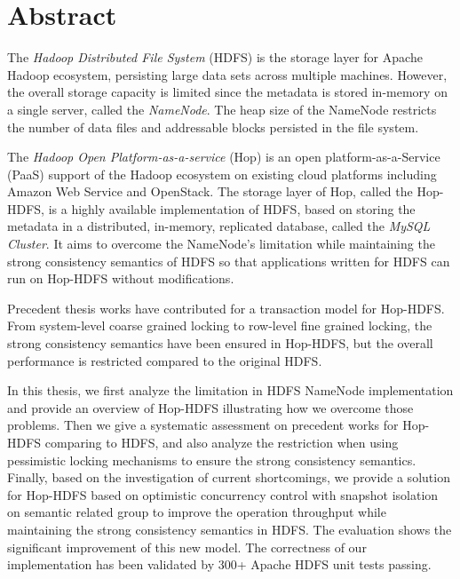 \chapter*{Abstract}
\thispagestyle{empty}

The \textit{Hadoop Distributed File System} (HDFS) is the storage layer for Apache Hadoop ecosystem, persisting large data sets across multiple machines. However, the overall storage capacity is limited since the metadata is stored in-memory on a single server, called the \textit{NameNode}. The heap size of the NameNode restricts the number of data files and addressable blocks persisted in the file system.

\noindent The \textit{Hadoop Open Platform-as-a-service} (Hop) is an open platform-as-a-Service (PaaS) support of the Hadoop ecosystem on existing cloud platforms including Amazon Web Service and OpenStack. The storage layer of Hop, called the Hop-HDFS, is a highly available implementation of HDFS, based on storing the metadata in a distributed, in-memory, replicated database, called the \textit{MySQL Cluster}. It aims to overcome the NameNode's limitation while maintaining the strong consistency semantics of HDFS so that applications written for HDFS can run on Hop-HDFS without modifications.

\noindent Precedent thesis works have contributed for a transaction model for Hop-HDFS. From system-level coarse grained locking to row-level fine grained locking, the strong consistency semantics have been ensured in Hop-HDFS, but the overall performance is restricted compared to the original HDFS.

\noindent In this thesis, we first analyze the limitation in HDFS NameNode implementation and provide an overview of Hop-HDFS illustrating how we overcome those problems. Then we give a systematic assessment on precedent works for Hop-HDFS comparing to HDFS, and also analyze the restriction when using pessimistic locking mechanisms to ensure the strong consistency semantics. Finally, based on the investigation of current shortcomings, we provide a solution for Hop-HDFS based on optimistic concurrency control with snapshot isolation on semantic related group to improve the operation throughput while maintaining the strong consistency semantics in HDFS. The evaluation shows the significant improvement of this new model. The correctness of our implementation has been validated by 300+ Apache HDFS unit tests passing.

\newpage


